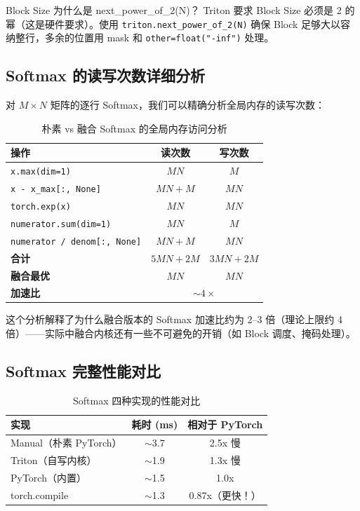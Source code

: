 \begin{knowledgebox}{Block Size 为什么是 next\_power\_of\_2(N)？}
Triton 要求 Block Size 必须是 2 的幂（这是硬件要求）。使用 \texttt{triton.next\_power\_of\_2(N)} 确保 Block 足够大以容纳整行，多余的位置用 mask 和 \texttt{other=float("-inf")} 处理。
\end{knowledgebox}

\subsection{Softmax 的读写次数详细分析}

对 $M \times N$ 矩阵的逐行 Softmax，我们可以精确分析全局内存的读写次数：

\begin{table}[H]
\centering
\begin{tabular}{lcc}
\toprule
\textbf{操作} & \textbf{读次数} & \textbf{写次数} \\
\midrule
\texttt{x.max(dim=1)} & $MN$ & $M$ \\
\texttt{x - x\_max[:, None]} & $MN + M$ & $MN$ \\
\texttt{torch.exp(x)} & $MN$ & $MN$ \\
\texttt{numerator.sum(dim=1)} & $MN$ & $M$ \\
\texttt{numerator / denom[:, None]} & $MN + M$ & $MN$ \\
\midrule
\textbf{合计} & $5MN + 2M$ & $3MN + 2M$ \\
\textbf{融合最优} & $MN$ & $MN$ \\
\textbf{加速比} & \multicolumn{2}{c}{$\sim 4\times$} \\
\bottomrule
\end{tabular}
\caption{朴素 vs 融合 Softmax 的全局内存访问分析}
\end{table}

这个分析解释了为什么融合版本的 Softmax 加速比约为 2--3 倍（理论上限约 4 倍）——实际中融合内核还有一些不可避免的开销（如 Block 调度、掩码处理）。

\subsection{Softmax 完整性能对比}

\begin{table}[H]
\centering
\begin{tabular}{lcc}
\toprule
\textbf{实现} & \textbf{耗时 (ms)} & \textbf{相对于 PyTorch} \\
\midrule
Manual（朴素 PyTorch） & $\sim$3.7 & 2.5x 慢 \\
Triton（自写内核） & $\sim$1.9 & 1.3x 慢 \\
PyTorch（内置） & $\sim$1.5 & 1.0x \\
torch.compile & $\sim$1.3 & 0.87x（更快！）\\
\bottomrule
\end{tabular}
\caption{Softmax 四种实现的性能对比}
\end{table}

